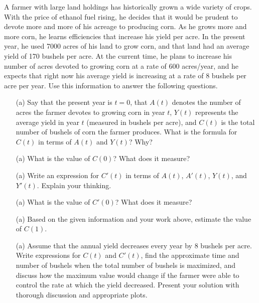\begin{lab}
    A farmer with large land holdings has historically grown a wide variety of crops.
    With the price of ethanol fuel rising, he decides that it would be prudent to devote
    more and more of his acreage to producing corn.  As he grows more and more corn, he
    learns efficiencies that increase his yield per acre.  In the present year, he used
    7000 acres of his land to grow corn, and that land had an average yield of 170 bushels
    per acre.  At the current time, he plans to increase his number of acres devoted to
    growing corn at a rate of 600 acres/year, and he expects that right now his average
    yield is increasing at a rate of 8 bushels per acre per year.  Use this information to
    answer the following questions.
    \begin{enumerate}
        \item[(a)] Say that the present year is $t = 0$, that $A(t)$ denotes the number of acres the farmer devotes to growing corn in year $t$, $Y(t)$ represents the average yield in year $t$ (measured in bushels per acre), and $C(t)$ is the total number of bushels of corn the farmer produces.  What is the formula for $C(t)$ in terms of $A(t)$ and $Y(t)$?  Why?
        \item[(a)] What is the value of $C(0)$?  What does it measure?
        \item[(a)] Write an expression for $C'(t)$ in terms of $A(t)$, $A'(t)$, $Y(t)$, and $Y'(t)$.  Explain your thinking.
        \item[(a)] What is the value of $C'(0)$?  What does it measure?
        \item[(a)] Based on the given information and your work above, estimate the value of $C(1)$.	
        \item[(a)] Assume that the annual yield decreases every year by 8 bushels per acre.  Write
        expressions for $C(t)$ and $C'(t)$, find the approximate time and number of
        bushels when the total number of bushels is maximized, and discuss how the maximum
        value would change if the farmer were able to control the rate at which the yield
        decreased. Present your solution with thorough discussion and appropriate plots.
\end{enumerate}
\end{lab}

